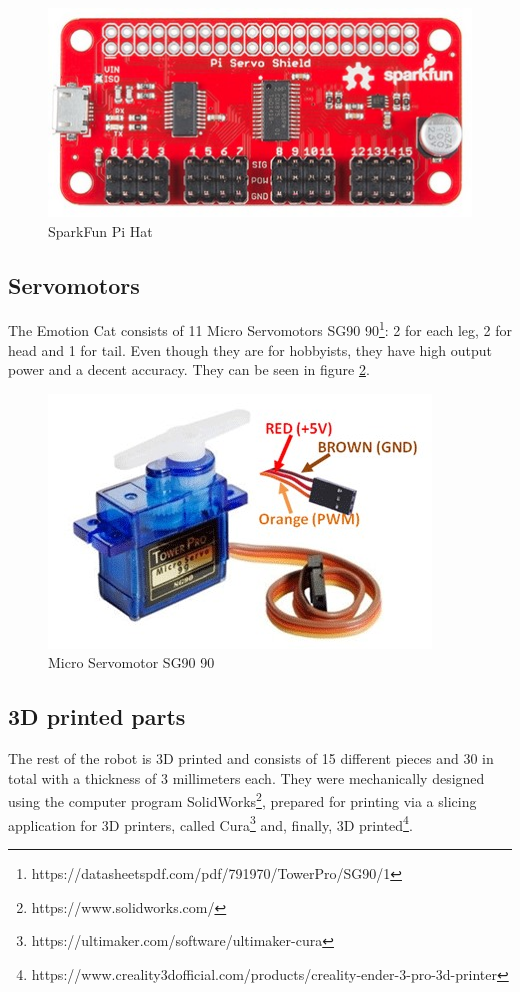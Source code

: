 \documentclass[runningheads,a4paper,12pt]{report}
\begin{document}
\begin{figure}
	\centering

  	\includegraphics[width=.6\linewidth]{./images/3_hat}\hfill

    \caption{SparkFun Pi Hat}  
    \label{fig:hat}
\end{figure}

\subsection*{Servomotors}
The Emotion Cat consists of 11 Micro Servomotors SG90 90\textdegree\footnote{https://datasheetspdf.com/pdf/791970/TowerPro/SG90/1}: 2 for each leg, 2 for head and 1 for tail. Even though they are for hobbyists, they have high output power and a decent accuracy. They can be seen in figure \ref{fig:servo}.

\begin{figure}
	\centering

  	\includegraphics[width=.6\linewidth]{./images/3_servo}\hfill

    \caption{Micro Servomotor SG90 90\textdegree}  
    \label{fig:servo}
\end{figure}

\subsection*{3D printed parts}
The rest of the robot is 3D printed and consists of 15 different pieces and 30 in total with a thickness of 3 millimeters each. They were mechanically designed using the computer program SolidWorks\footnote{https://www.solidworks.com/}, prepared for printing via a slicing application for 3D printers, called Cura\footnote{https://ultimaker.com/software/ultimaker-cura} and, finally, 3D printed\footnote{https://www.creality3dofficial.com/products/creality-ender-3-pro-3d-printer}.  
\end{document}
